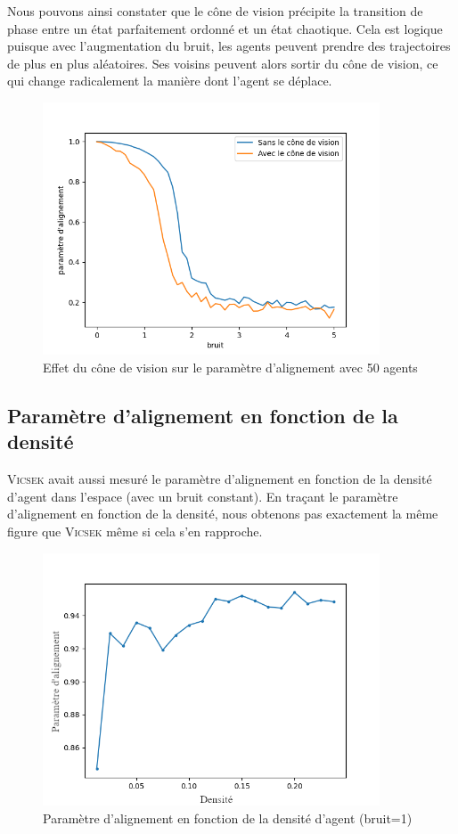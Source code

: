 \documentclass[french, a4paper, 12pt, openany]{report}
\begin{document}
	Nous pouvons ainsi constater que le cône de vision précipite la transition de phase entre un état parfaitement ordonné et un état chaotique. Cela est logique puisque avec l'augmentation du bruit, les agents peuvent prendre des trajectoires de plus en plus aléatoires. Ses voisins peuvent alors sortir du cône de vision, ce qui change radicalement la manière dont l'agent se déplace.
	 \begin{figure}[!h]
		\centering
		\includegraphics[width=10cm]{images/bruit_comparaison[50 mesures par pts].png}
		\caption{Effet du cône de vision sur le paramètre d'alignement avec 50 agents}
		\label{cone_vision_alignement}
	\end{figure}
    \newpage
    \subsection{Paramètre d'alignement en fonction de la densité}

    \textsc{Vicsek} avait aussi mesuré le paramètre d'alignement en fonction de la densité d'agent dans l'espace (avec un bruit constant). En traçant le paramètre d'alignement en fonction de la densité, nous obtenons pas exactement la même figure que \textsc{Vicsek} même si cela s'en rapproche.
      
       \begin{figure}[!h]
		\centering
		\includegraphics[width=10cm]{images/densite_1[noise=1]2.png}
		\caption{Paramètre d'alignement en fonction de la densité d'agent (bruit=1)}
		\label{densité_alignement}
	\end{figure}
	
\end{document}
